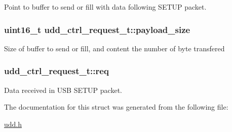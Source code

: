 \-Point to buffer to send or fill with data following \-S\-E\-T\-U\-P packet. 

\hypertarget{structudd__ctrl__request__t_a0ba5f434c1f252576dd707db0034917c}{
\subsubsection[{payload\-\_\-size}]{\setlength{\rightskip}{0pt plus 5cm}uint16\-\_\-t {\bf udd\-\_\-ctrl\-\_\-request\-\_\-t\-::payload\-\_\-size}}}
\label{structudd__ctrl__request__t_a0ba5f434c1f252576dd707db0034917c}
\-Size of buffer to send or fill, and content the number of byte transfered \hypertarget{structudd__ctrl__request__t_a911ea25898e490e2095496e5fe24b1fe}{
\subsubsection[{req}]{ {\bf udd\-\_\-ctrl\-\_\-request\-\_\-t\-::req}}}
\label{structudd__ctrl__request__t_a911ea25898e490e2095496e5fe24b1fe}


\-Data received in \-U\-S\-B \-S\-E\-T\-U\-P packet. 



\-The documentation for this struct was generated from the following file\-:\begin{DoxyCompactItemize}
\item 
\hyperlink{udd_8h}{udd.\-h}\end{DoxyCompactItemize}
